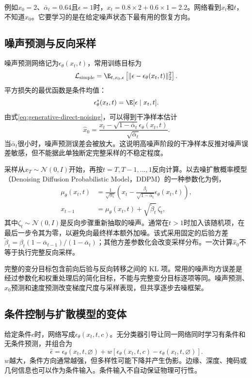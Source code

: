 例如$x_0=2$、$\bar\alpha_t=0.64$且$\epsilon=1$时，$x_t=0.8\times2+0.6\times1=2.2$。网络看到$x_t$和$t$，不知道$x_0$。它要学习的是在给定噪声状态下最有用的恢复方向。

\subsection{噪声预测与反向采样}

噪声预测网络记为$\epsilon_{\theta}(x_t,t)$，常用训练目标为
\begin{equation}
\mathcal L_{\mathrm{simple}}=\E_{t,x_0,\epsilon}\left[\|\epsilon-\epsilon_{\theta}(x_t,t)\|_2^2\right].
\end{equation}
平方损失的最优函数是条件均值：
\[
\epsilon_{\theta}^*(x_t,t)=\E[\epsilon\mid x_t,t].
\]
由式\eqref{eq:generative-direct-noising}，可以得到干净样本估计
\[
\widehat x_0=\frac{x_t-\sqrt{1-\bar\alpha_t}\epsilon_{\theta}(x_t,t)}{\sqrt{\bar\alpha_t}}.
\]
当$\bar\alpha_t$很小时，噪声预测误差会被放大。这说明高噪声阶段的干净样本反推对噪声误差敏感，但不能据此单独断定完整采样的不稳定程度。

采样从$x_T\sim\mathcal N(0,I)$开始，再按$t=T,T-1,\ldots,1$反向计算。以去噪扩散概率模型（Denoising Diffusion Probabilistic Model，DDPM）的一种参数化为例，
\begin{align}
\mu_{\theta}(x_t,t)&=\frac1{\sqrt{\alpha_t}}
\left(x_t-\frac{\beta_t}{\sqrt{1-\bar\alpha_t}}\epsilon_{\theta}(x_t,t)\right),\\
x_{t-1}&=\mu_{\theta}(x_t,t)+\sqrt{\widetilde\beta_t}\,\zeta_t,
\end{align}
其中$\zeta_t\sim\mathcal N(0,I)$是反向步骤重新抽取的噪声。通常在$t>1$时加入该随机项，在最后一步令其为零，以避免向最终样本额外加噪。该式采用固定的后验方差$\widetilde\beta_t=\beta_t(1-\bar\alpha_{t-1})/(1-\bar\alpha_t)$；其他方差参数化会改变采样分布。一次计算$\widehat x_0$不等于执行完整反向采样。

完整的变分目标包含前向后验与反向转移之间的 KL 项。常用的噪声均方误差是经过参数化和权重处理后的简化目标，不能与完整变分目标逐项等同。噪声预测、$x_0$预测和速度预测改变梯度尺度与采样表现，但共享逐步去噪框架。

\subsection{条件控制与扩散模型的变体}

给定条件$c$时，网络写成$\epsilon_{\theta}(x_t,t,c)$。无分类器引导让同一网络同时学习有条件和无条件预测，并组合为
\begin{equation}
\widehat\epsilon=\epsilon_{\theta}(x_t,t,\varnothing)+w\left[\epsilon_{\theta}(x_t,t,c)-\epsilon_{\theta}(x_t,t,\varnothing)\right].
\end{equation}
$w$越大，条件方向通常越强，但多样性可能下降并产生伪影。边缘、深度、掩码或几何信息也可以作为条件输入。条件输入不自动保证物理可行性。

